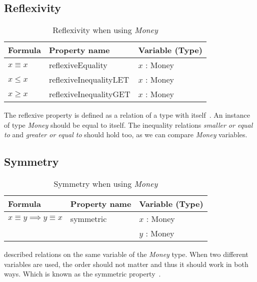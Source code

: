 \subsection*{Reflexivity}
\label{ssct:properties_reflexivity}
\begin{table}[!ht]
\centering
\begin{tabular}{lll}
\hline
                        \textbf{Formula} & \textbf{Property name} & \textbf{Variable (Type)} \\ \hline
\rowcolor[HTML]{EFEFEF} $x \equiv x$     & reflexiveEquality      & $x$ : Money              \\
                        $x \leq x$       & reflexiveInequalityLET & $x$ : Money              \\
\rowcolor[HTML]{EFEFEF} $x \geq x$       & reflexiveInequalityGET & $x$ : Money              \\ \hline
\end{tabular}
\caption{Reflexivity when using \textit{Money}}
\label{tbl:ch4_money_reflexivity}
\end{table}
\FloatBarrier\noindent
The reflexive property is defined as a relation of a type with
itself~\cite{raftery2011perspective}. An instance of type \textit{Money} should
be equal to itself. The inequality relations \textit{smaller or equal to} and
\textit{greater or equal to} should hold too, as we can compare \textit{Money}
variables.

\subsection*{Symmetry}
\label{ssct:properties_symmetry}
\begin{table}[!ht]
\centering
\begin{tabular}{lll}
\hline
                        \textbf{Formula}                 & \textbf{Property name} & \textbf{Variable (Type)} \\ \hline
\rowcolor[HTML]{EFEFEF} $x \equiv y \implies y \equiv x$ & symmetric              & $x$ : Money              \\
\rowcolor[HTML]{EFEFEF}                                  &                        & $y$ : Money              \\ \hline
\end{tabular}
\caption{Symmetry when using \textit{Money}}
\label{tbl:ch4_money_symmetry}
\end{table}
\FloatBarrier\noindent
 described relations on the same variable
of the \textit{Money} type. When two different variables are used, the order
should not matter and thus it should work in both ways. Which is known as the
symmetric property~\cite{raftery2011perspective}.

